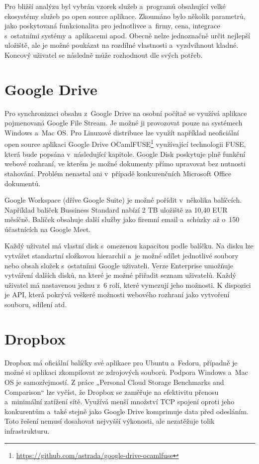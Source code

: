 Pro bližší analýzu byl vybrán vzorek služeb a programů obsahující velké ekosystémy služeb po open source aplikace. Zkoumáno bylo několik parametrů,
jako poskytovaná funkcionalita pro jednotlivce a firmy, cena, integrace s ostatními systémy a aplikacemi apod. Obecně nelze jednoznačně určit nejlepší uložiště, 
ale je možné poukázat na rozdílné vlastnosti a vyzdvihnout kladné. Koncový uživatel se následně může rozhodnout dle svých potřeb.

\section{Google Drive}

Pro synchronizaci obsahu z Google Drive na osobní počítač se využívá aplikace pojmenovaná Google File Stream. Je možné ji provozovat pouze na systémech
Windows a Mac OS.\cite{GoogleFileStream} Pro Linuxové distribuce lze využít například neoficiální open source aplikaci 
Google Drive OCamlFUSE\footnote{\url{https://github.com/astrada/google-drive-ocamlfuse}} využívající technologii
FUSE, která bude popsána v následující kapitole. Google Disk poskytuje plně funkční webové rozhraní,
ve kterém je možné dokumenty přímo upravovat bez nutnosti stahování. Problém nenastal ani v případě konkurenčních Microsoft Office dokumentů. 

Google Workspace (dříve Google Suite) je možné pořídit v několika balíčcích. Například balíček Bussiness Standard nabízí 2 TB uložiště za 10,40 EUR měsíčně.
Balíček obsahuje další služby jako firemní email a schůzky až o 150 účastnících na Google Meet.\cite{GoogleWorkspace}

Každý uživatel má vlastní disk s omezenou kapacitou podle balíčku. Na disku lze vytvářet standartní složkovou hierarchii a je možné sdílet jednotlivé soubory nebo
obsah složek s ostatními Google uživateli. Verze Enterprise umožňuje vytváření dalších disků, na které je možné přiřadit seznam uživatelů. Každý uživatel
má nastavenou jednu z 6 rolí, které vymezují jeho možnosti. K dispozici je API, která pokrývá veškeré možnosti webového rozhraní jako vytvoření souboru,
sdílení atd.\cite{GoogleAPIReference}

\section{Dropbox}

Dropbox má oficiální balíčky své aplikace pro Ubuntu a Fedoru, případně je možné si aplikaci zkompilovat ze zdrojových souborů. Podpora Windows a Mac OS je samozřejmostí.
Z práce „Personal Cloud Storage Benchmarks and Comparison“ lze vyčíst, že Dropbox se zaměřuje na efektivitu přenosu a minimální zatížení sítě.
Využívá menší množství TCP spojení oproti jeho konkurentům a také stejně jako Google Drive komprimuje data před odesláním.\cite{CloudStorageComparison}
Toto řešení nemusí dosahovat nejvyšší výkonosti, ale nezatěžuje tolik infrastrukturu. 

